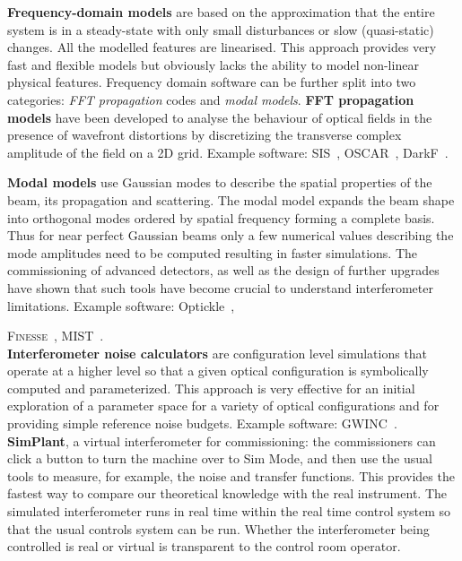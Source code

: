 \textbf{Frequency-domain models} are based on the approximation that the entire system is in a steady-state with only small disturbances or slow (quasi-static) changes. All the modelled features are linearised.
This approach provides very fast and flexible models but obviously lacks the ability to model non-linear physical features. Frequency domain software can be further split
into two categories: \emph{FFT propagation} codes and \emph{modal models}.
\newpage
\textbf{FFT propagation models} have been developed to analyse the
  behaviour of optical fields in the presence of wavefront distortions by discretizing the transverse complex amplitude of the field on a 2D grid. 
  Example software: SIS~\cite{SIS}, OSCAR~\cite{OSCAR},
  DarkF~\cite{DarkF, Vinet92}.
 
\textbf{Modal models} use Gaussian modes to describe the spatial properties of the beam, its propagation and scattering. The modal model expands the beam shape into orthogonal modes ordered by spatial frequency forming a complete basis. Thus for near perfect Gaussian beams only a few numerical values describing the mode amplitudes need to be computed resulting in faster simulations. The commissioning of advanced detectors, as well as the design of further upgrades have shown that such tools have become crucial to understand interferometer limitations. 
Example software: Optickle~\cite{Optickle}, 

\textsc{Finesse}~\cite{Finesse, Freise04}, MIST~\cite{MIST}.\\
\textbf{Interferometer noise calculators} are configuration level simulations that operate at a higher level so that a given optical configuration is symbolically computed and parameterized. 
This approach is very effective for an initial exploration of a parameter space for a variety of optical configurations and for providing simple reference noise budgets. Example software: GWINC~\cite{GWINC}.\\
\textbf{SimPlant}, a virtual interferometer for commissioning: the commissioners can click a button to turn the machine over to Sim Mode, and then use the usual tools to measure, for example, the noise and transfer functions. This provides the fastest way to compare our theoretical knowledge with the real instrument.
The simulated interferometer runs in real time within the real time control system so that the usual controls system can be run. Whether the interferometer being controlled is real or virtual is transparent to the control room operator.

